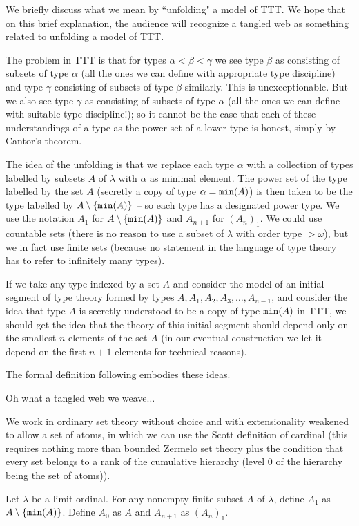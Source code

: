 \documentclass{slides}
\begin{document}
We briefly discuss what we mean by ``unfolding" a model of TTT.  We hope that on this brief explanation, the audience will recognize a tangled web as something
related to unfolding a model of TTT.

The problem in TTT is that for types $\alpha<\beta<\gamma$ we see type $\beta$ as consisting of subsets of type $\alpha$ (all the ones we can define with appropriate type discipline)
and type $\gamma$ consisting of  subsets of type $\beta$ similarly.  This is unexceptionable.  But we also see type $\gamma$ as consisting of subsets of type $\alpha$ (all the ones we can define with suitable type discipline!); so it cannot be the case that each of these understandings of a type as the power set of a lower type is honest, simply by Cantor's theorem.

The idea of the unfolding is that we replace each type $\alpha$ with a collection of types labelled by subsets $A$ of $\lambda$ with $\alpha$ as minimal element.  The power
set of the type labelled by the set $A$ (secretly a copy of type $\alpha = {\tt min}(A)$) is then taken to be the type labelled by $A \setminus \{{\tt min}(A)\}$ -- so each type has a designated power type.  We use the notation $A_1$ for $A \setminus \{{\tt min}(A)\}$ and $A_{n+1}$ for $(A_n)_1$.  We could use countable sets (there is no reason to use a subset of $\lambda$ with order type $>\omega$), but we in fact use finite sets
(because no statement in the language of type theory has to refer to infinitely many types).

If we take any type indexed by a set $A$ and consider the model of an initial segment of type theory formed by types $A, A_1, A_2, A_3,\ldots,A_{n-1}$, and consider
the idea that type $A$ is secretly understood to be a copy of type ${\tt min}(A)$ in TTT, we should get the idea that the theory of this initial segment should depend only on the smallest $n$ elements
of the set $A$ (in our eventual construction we let it depend on the first $n+1$ elements for technical reasons).

The formal definition following embodies these ideas.

\begin{slide}

\end{slide}

\begin{slide}

{\Large Oh what a tangled web we weave$\ldots$}

We work in ordinary set theory without choice and with extensionality weakened to allow a set of atoms, in which we can use the Scott definition of cardinal (this requires nothing more than bounded Zermelo set theory plus
the condition that every set belongs to a rank of the cumulative hierarchy (level 0 of the hierarchy being the set of atoms)).

Let $\lambda$ be a limit ordinal.  For any nonempty finite subset $A$ of $\lambda$, define $A_1$ as $A \setminus \{{\tt min}(A)\}$.   Define $A_0$ as $A$
and $A_{n+1}$ as $(A_n)_1$.

\end{slide}
\end{document}
